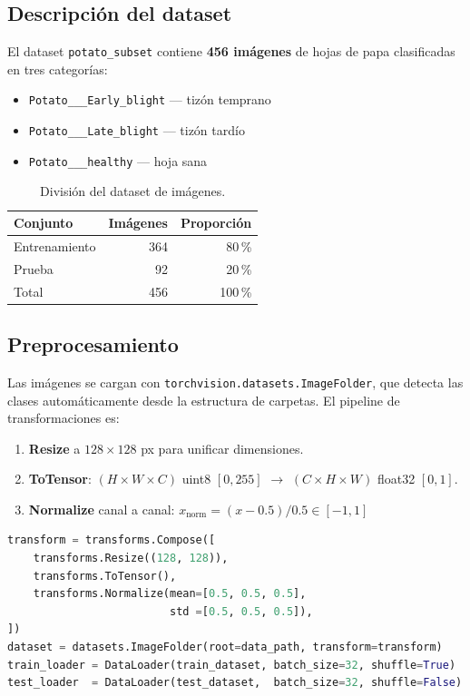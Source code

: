 \documentclass[12pt,a4paper]{article}
\begin{document}
\subsection{Descripción del dataset}

El dataset \texttt{potato\_subset} contiene \textbf{456 imágenes} de hojas de
papa clasificadas en tres categorías:

\begin{itemize}
  \item \texttt{Potato\_\_\_Early\_blight} — tizón temprano
  \item \texttt{Potato\_\_\_Late\_blight}  — tizón tardío
  \item \texttt{Potato\_\_\_healthy}        — hoja sana
\end{itemize}

\begin{table}[H]
  \centering
  \begin{tabular}{lrr}
    \toprule
    \textbf{Conjunto} & \textbf{Imágenes} & \textbf{Proporción} \\
    \midrule
    Entrenamiento & 364 & 80\,\% \\
    Prueba        &  92 & 20\,\% \\
    \midrule
    Total & 456 & 100\,\% \\
    \bottomrule
  \end{tabular}
  \caption{División del dataset de imágenes.}
\end{table}

\subsection{Preprocesamiento}

Las imágenes se cargan con \texttt{torchvision.datasets.ImageFolder}, que
detecta las clases automáticamente desde la estructura de carpetas. El pipeline
de transformaciones es:

\begin{enumerate}
  \item \textbf{Resize} a $128 \times 128$ px para unificar dimensiones.
  \item \textbf{ToTensor}: $(H \times W \times C)$ uint8 $[0,255]$
        $\to$ $(C \times H \times W)$ float32 $[0,1]$.
  \item \textbf{Normalize} canal a canal:
        $x_{\text{norm}} = (x - 0.5) / 0.5 \in [-1, 1]$
\end{enumerate}

\begin{lstlisting}[language=Python, caption={Transformaciones e ImageFolder (\texttt{dataset.py})}]
transform = transforms.Compose([
    transforms.Resize((128, 128)),
    transforms.ToTensor(),
    transforms.Normalize(mean=[0.5, 0.5, 0.5],
                         std =[0.5, 0.5, 0.5]),
])
dataset = datasets.ImageFolder(root=data_path, transform=transform)
train_loader = DataLoader(train_dataset, batch_size=32, shuffle=True)
test_loader  = DataLoader(test_dataset,  batch_size=32, shuffle=False)
\end{lstlisting}
\end{document}

